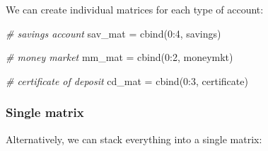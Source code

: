 \documentclass[
]{book}
\newenvironment{Shaded}{\begin{snugshade}}{\end{snugshade}}
\newcommand{\CommentTok}[1]{\textcolor[rgb]{0.56,0.35,0.01}{\textit{#1}}}
\newcommand{\DecValTok}[1]{\textcolor[rgb]{0.00,0.00,0.81}{#1}}
\newcommand{\FunctionTok}[1]{\textcolor[rgb]{0.00,0.00,0.00}{#1}}
\newcommand{\NormalTok}[1]{#1}
\newcommand{\OtherTok}[1]{\textcolor[rgb]{0.56,0.35,0.01}{#1}}
\newcommand{\SpecialCharTok}[1]{\textcolor[rgb]{0.00,0.00,0.00}{#1}}
\begin{document}
We can create individual matrices for each type of account:

\begin{Shaded}
\begin{Highlighting}[]
\CommentTok{\# savings account}
\NormalTok{sav\_mat }\OtherTok{=} \FunctionTok{cbind}\NormalTok{(}\DecValTok{0}\SpecialCharTok{:}\DecValTok{4}\NormalTok{, savings)}
\end{Highlighting}
\end{Shaded}

\begin{Shaded}
\begin{Highlighting}[]
\CommentTok{\# money market}
\NormalTok{mm\_mat }\OtherTok{=} \FunctionTok{cbind}\NormalTok{(}\DecValTok{0}\SpecialCharTok{:}\DecValTok{2}\NormalTok{, moneymkt)}
\end{Highlighting}
\end{Shaded}

\begin{Shaded}
\begin{Highlighting}[]
\CommentTok{\# certificate of deposit}
\NormalTok{cd\_mat }\OtherTok{=} \FunctionTok{cbind}\NormalTok{(}\DecValTok{0}\SpecialCharTok{:}\DecValTok{3}\NormalTok{, certificate)}
\end{Highlighting}
\end{Shaded}

\hypertarget{single-matrix}{%
\subsubsection*{Single matrix}\label{single-matrix}}

Alternatively, we can stack everything into a single matrix:
\end{document}
